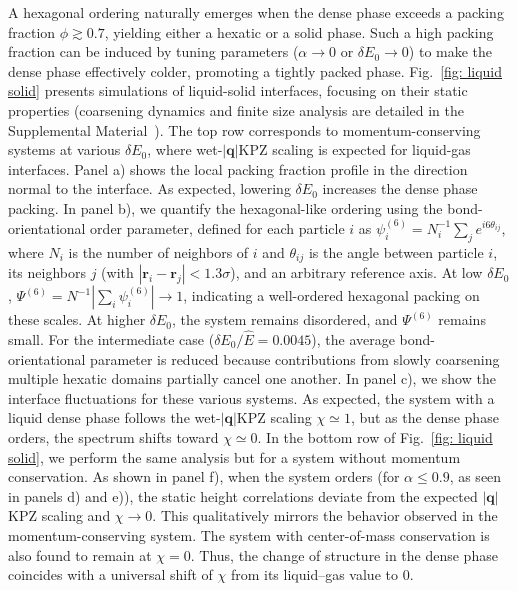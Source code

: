 \documentclass[aps,
reprint,
superscriptaddress,









amsmath,amssymb,floatfix,






prl
]{revtex4-2}
\begin{document}
A hexagonal ordering naturally emerges when the dense phase exceeds a packing fraction $\phi \gtrsim 0.7$, yielding either a hexatic or a solid phase. Such a high packing fraction can be induced by tuning parameters ($\alpha \to 0$ or $\delta E_0 \to 0$) to make the dense phase effectively colder, promoting a tightly packed phase. Fig.~\ref{fig: liquid solid} presents simulations of liquid-solid interfaces, focusing on their static properties (coarsening dynamics and finite size analysis are detailed in the Supplemental Material~\cite{supp}).  The top row corresponds to momentum-conserving systems at various $\delta E_0$, where wet-$|\bm q|$KPZ scaling is expected for liquid-gas interfaces. Panel a) shows the local packing fraction profile in the direction normal to the interface. As expected, lowering $\delta E_0$ increases the dense phase packing. In panel b), we quantify the hexagonal-like ordering using the bond-orientational order parameter, defined for each particle $i$ as $\psi_i^{(6)}=N_i^{-1}\sum_{j} e^{i6\theta_{ij}}$, where $N_i$ is the number of neighbors of $i$ and $\theta_{ij}$ is the angle between particle $i$, its neighbors $j$ (with $|\bm r_i - \bm r_j| < 1.3\sigma$), and an arbitrary reference axis. At low $\delta E_0$, $\Psi^{(6)} =N^{-1}|\sum_i \psi_i^{(6)}| \to 1$, indicating a well-ordered hexagonal packing on these scales. At higher $\delta E_0$, the system remains disordered, and $\Psi^{(6)}$ remains small. For the intermediate case ($\delta E_0/\hat E = 0.0045$), the average bond-orientational parameter is reduced because contributions from slowly coarsening multiple hexatic domains partially cancel one another. In panel c), we show the interface fluctuations for these various systems. As expected, the system with a liquid dense phase follows the wet-$|\bm q|$KPZ scaling $\chi\simeq 1$, but as the dense phase orders, the spectrum shifts toward $\chi \simeq 0$. In the bottom row of Fig.~\ref{fig: liquid solid}, we perform the same analysis but for a system without momentum conservation. As shown in panel f), when the system orders (for $\alpha \leq 0.9$, as seen in panels d) and e)), the static height correlations deviate from the expected $|\bm q|$KPZ scaling and $\chi \to 0$. This qualitatively mirrors the behavior observed in the momentum-conserving system. The system with center-of-mass conservation is also found to remain at $\chi = 0$. Thus, the change of structure in the dense phase coincides with a universal shift of $\chi$ from its liquid–gas value to $0$.
\end{document}
